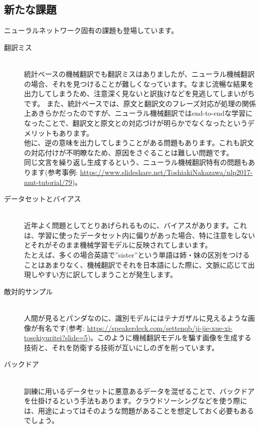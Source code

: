 \documentclass[mingoth,a4paper]{jsarticle}
\begin{document}
\subsection{新たな課題}

ニューラルネットワーク固有の課題も登場しています。

\begin{description}
\item[翻訳ミス] \mbox{} \\
  統計ベースの機械翻訳でも翻訳ミスはありましたが、ニューラル機械翻訳の場合、それを見つけることが難しくなっています。なまじ流暢な結果を出力してしまうため、注意深く見ないと訳抜けなどを見逃してしまいがちです。
  また、統計ベースでは、原文と翻訳文のフレーズ対応が処理の関係上あきらかだったのですが、ニューラル機械翻訳ではend-to-endな学習になったことで、翻訳文と原文との対応づけが明らかでなくなったというデメリットもあります。\\
  他に、逆の意味を出力してしまうことがある問題もあります。これも訳文の対応付けが不明瞭なため、原因をさぐることは難しい問題です。\\
  同じ文言を繰り返し生成するという、ニューラル機械翻訳特有の問題もあります(参考事例: \url{https://www.slideshare.net/ToshiakiNakazawa/nlp2017-nmt-tutorial/79})。
\item[データセットとバイアス] \mbox{} \\
  近年よく問題としてとりあげられるものに、バイアスがあります。これは、学習に使ったデータセット内に偏りがあった場合、特に注意をしないとそれがそのまま機械学習モデルに反映されてしまいます。\\
  たとえば、多くの場合英語で''sister''という単語は姉・妹の区別をつけることはあまりなく、機械翻訳でそれを日本語にした際に、文脈に応じて出現しやすい方に訳してしまうことが発生します。
\item[敵対的サンプル] \mbox{} \\
  人間が見るとパンダなのに、識別モデルにはテナガザルに見えるような画像が有名です(参考: \url{https://speakerdeck.com/settenqb/ji-jie-xue-xi-tosekiyuritei?slide=5})。このように機械翻訳モデルを騙す画像を生成する技術と、それを防衛する技術が互いにしのぎを削っています。
\item[バックドア] \mbox{} \\
  訓練に用いるデータセットに悪意あるデータを混ぜることで、バックドアを仕掛けるという手法もあります。クラウドソーシングなどを使う際には、用途によってはそのような問題があることを想定しておく必要もあるでしょう。
\end{description}
\end{document}
